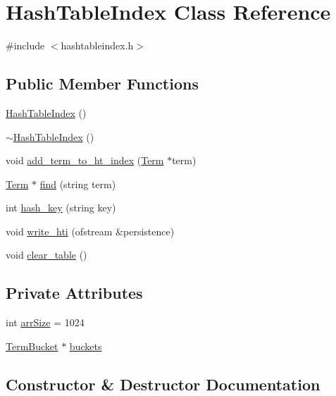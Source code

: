 \hypertarget{class_hash_table_index}{}\section{Hash\+Table\+Index Class Reference}
\label{class_hash_table_index}


{\ttfamily \#include $<$hashtableindex.\+h$>$}

\subsection*{Public Member Functions}
\begin{DoxyCompactItemize}
\item 
\hyperlink{class_hash_table_index_a13c1c8deae84226c8bef382adf103b53}{Hash\+Table\+Index} ()
\item 
\hyperlink{class_hash_table_index_af4d2eeae8263c353f91140cb2583fb58}{$\sim$\+Hash\+Table\+Index} ()
\item 
void \hyperlink{class_hash_table_index_a383ac825c3dde6dd2791bb121da7138d}{add\+\_\+term\+\_\+to\+\_\+ht\+\_\+index} (\hyperlink{class_term}{Term} $\ast$term)
\item 
\hyperlink{class_term}{Term} $\ast$ \hyperlink{class_hash_table_index_a5934917eb943ab770d86ab7ff9142aab}{find} (string term)
\item 
int \hyperlink{class_hash_table_index_a93a1393996af092def6a7f2b9156f2c6}{hash\+\_\+key} (string key)
\item 
void \hyperlink{class_hash_table_index_a8ed7978b35943e4b89526bb5d7017f05}{write\+\_\+hti} (ofstream \&persistence)
\item 
void \hyperlink{class_hash_table_index_a253a51a2195d47b3350fdc27fd3d4077}{clear\+\_\+table} ()
\end{DoxyCompactItemize}
\subsection*{Private Attributes}
\begin{DoxyCompactItemize}
\item 
int \hyperlink{class_hash_table_index_a7253d4d2a147715df75217f1731245e9}{arr\+Size} = 1024
\item 
\hyperlink{class_term_bucket}{Term\+Bucket} $\ast$ \hyperlink{class_hash_table_index_a7737d10bb5720666b0bff86376a82a11}{buckets}
\end{DoxyCompactItemize}


\subsection{Constructor \& Destructor Documentation}
\hypertarget{class_hash_table_index_a13c1c8deae84226c8bef382adf103b53}{}
